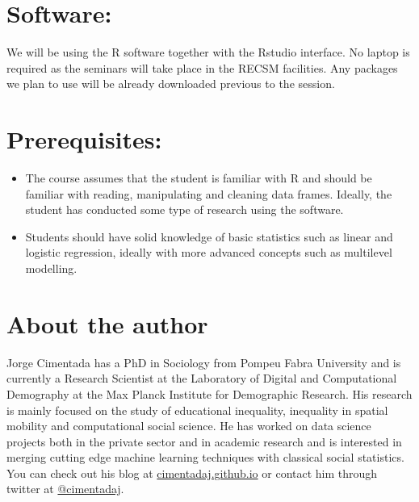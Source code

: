\documentclass[
]{book}
\begin{document}
\hypertarget{software}{%
\section{Software:}\label{software}}

We will be using the R software together with the Rstudio interface. No laptop is required as the seminars will take place in the RECSM facilities. Any packages we plan to use will be already downloaded previous to the session.

\hypertarget{prerequisites}{%
\section{Prerequisites:}\label{prerequisites}}

\begin{itemize}
\item
  The course assumes that the student is familiar with R and should be familiar with reading, manipulating and cleaning data frames. Ideally, the student has conducted some type of research using the software.
\item
  Students should have solid knowledge of basic statistics such as linear and logistic regression, ideally with more advanced concepts such as multilevel modelling.
\end{itemize}

\hypertarget{about-the-author}{%
\section{About the author}\label{about-the-author}}

Jorge Cimentada has a PhD in Sociology from Pompeu Fabra University and is currently a Research Scientist at the Laboratory of Digital and Computational Demography at the Max Planck Institute for Demographic Research. His research is mainly focused on the study of educational inequality, inequality in spatial mobility and computational social science. He has worked on data science projects both in the private sector and in academic research and is interested in merging cutting edge machine learning techniques with classical social statistics. You can check out his blog at \href{https://cimentadaj.github.io/about/}{cimentadaj.github.io} or contact him through twitter at \href{https://twitter.com/cimentadaj/}{@cimentadaj}.

\backmatter
  
\end{document}
